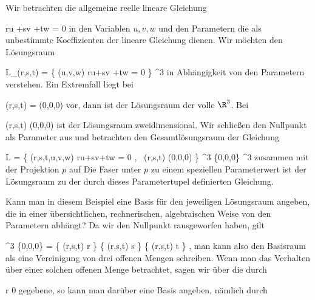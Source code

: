 {





Wir betrachten die allgemeine reelle lineare Gleichung

\mavergleichskettedisp
{\vergleichskette
{ru +sv +tw
}
{ =} { 0
}
{ } {
}
{ } {
}
{ } {
}
}
{}{}{}
in den Variablen $u,v,w$ und den Parametern
 die als unbestimmte Koeffizienten der lineare Gleichung dienen. Wir möchten den Lösungsraum

\mavergleichskettedisp
{\vergleichskette
{L_{(r,s,t)}
}
{ =} { \left\{ (u,v,w)  \mid  ru+sv +tw = 0         \right\}
}
{ \subseteq} { \R^3
}
{ } {
}
{ } {
}
}
{}{}{}
in Abhängigkeit von den Parametern
 verstehen. Ein Extremfall liegt bei

\mavergleichskette
{\vergleichskette
{(r,s,t)
}
{ = }{(0,0,0)
}
{  }{
}
{    }{
}
{   }{
}
}
{}{}{}
vor, dann ist der Lösungsraum der volle $\R^3$. Bei

\mavergleichskette
{\vergleichskette
{(r,s,t)
}
{ \neq }{(0,0,0)
}
{  }{
}
{    }{
}
{   }{
}
}
{}{}{}
ist der Lösungsraum zweidimensional. Wir schließen den Nullpunkt als Parameter aus und betrachten den Gesamtlösungsraum der Gleichung

\mavergleichskettedisp
{\vergleichskette
{L
}
{ =} { \left\{ (r,s,t,u,v,w)  \mid  ru+sv+tw = 0 , \, (r,s,t) \neq (0,0,0)       \right\}
}
{ \subseteq} { \R^3 \setminus \{0,0,0\} \times \R^3
}
{ } {
}
{ } {
}
}
{}{}{}
zusammen mit der Projektion $p$ auf
 Die Faser unter $p$  zu einem speziellen Parameterwert
 ist der Lösungsraum
 zu der durch dieses Parametertupel definierten Gleichung.

Kann man in diesem Beispiel eine Basis für den jeweiligen Lösungsraum angeben, die in einer übersichtlichen, rechnerischen, algebraischen Weise von den Parametern  abhängt? Da wir den Nullpunkt rausgeworfen haben, gilt

\mavergleichskettedisp
{\vergleichskette
{ \R^3 \setminus \{0,0,0\}
}
{ =} { \left\{ (r,s,t)  \mid  r         \right\}  \cup \left\{ (r,s,t)  \mid  s         \right\}  \cup \left\{ (r,s,t)  \mid  t         \right\}
}
{ } {
}
{ } {
}
{ } {
}
}
{}{}{,}
man kann also den Basisraum als eine Vereinigung von drei offenen Mengen schreiben. Wenn man das Verhalten über einer solchen offenen Menge betrachtet, sagen wir über die durch

\mavergleichskette
{\vergleichskette
{r
}
{ \neq }{ 0
}
{  }{
}
{    }{
}
{   }{
}
}
{}{}{}
gegebene, so kann man darüber eine Basis angeben, nämlich durch

}

